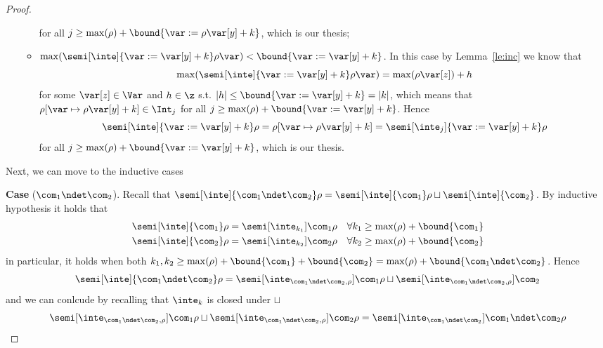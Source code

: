 \begin{proof}
\begin{itemize}
\begin{itemize}
      for all \(j \geq \max(\rho) + \bound{\var := \rho\var[y] + k}\),
      which is our thesis;
    \item
      \({\max(\semi[\inte]{\var := \var[y] + k}\rho\var)} <
      \bound{\var := \var[y] + k}\). In this case by
      Lemma~\ref{le:inc} we know that
      \begin{equation*}
        {\max(\semi[\inte]{\var := \var[y] + k}\rho\var)} = {\max(\rho\var[z]) + h}
      \end{equation*}
      for some \(\var[z] \in \Var\) and \(h \in \z\) s.t.
      \(|h| \leq \bound{\var := \var[y] + k} = |k|\), which means that
      \({\rho[\var \mapsto \rho\var[y] + k]} \in \Int_j\) for all
      \(j \geq \max(\rho) + \bound{\var := \var[y] + k}\).
      Hence
      \begin{equation*}
        \semi[\inte]{\var := \var[y] + k}\rho =
        \rho[\var \mapsto \rho\var[y] + k] =
        \semi[\inte_j]{\var := \var[y] + k}\rho
      \end{equation*}
      for all \(j \geq \max(\rho) + \bound{\var := \var[y] + k}\),
      which is our thesis.
    \end{itemize}
  \end{itemize}
  
  \medskip
  \noindent
  Next, we can move to the inductive cases
  
  \medskip
  
  \noindent
  \textbf{Case} (\(\com_1 \ndet \com_2\)).
  Recall that
  \({\semi[\inte]{\com_1 \ndet \com_2}\rho} =
  {\semi[\inte]{\com_1}\rho} \sqcup {\semi[\inte]{\com_2}}\). By
  inductive hypothesis it holds that
  \begin{align*}
    {\semi[\inte]{\com_1}\rho} & = \semi[\inte_{k_1}]{\com_1}\rho & \forall k_1 \geq \max(\rho) + \bound{\com_1} \\
    {\semi[\inte]{\com_2}\rho} & = \semi[\inte_{k_2}]{\com_2}\rho & \forall k_2 \geq \max(\rho) + \bound{\com_2}
  \end{align*}
  in particular, it holds when both
  \({k_1, k_2} \geq {\max(\rho) + \bound{\com_1} + \bound{\com_2}} =
  {\max(\rho) + \bound{\com_1 \ndet \com_2}}\). Hence
  \begin{equation*}
    {\semi[\inte]{\com_1 \ndet \com_2}\rho} = {\semi[\inte_{\com_1 \ndet \com_2, \rho}]{\com_1}\rho} \sqcup {\semi[\inte_{\com_1 \ndet \com_2, \rho}]{\com_2}}
  \end{equation*}
  and we can conlcude by recalling that \(\inte_k\) is closed under
  \(\sqcup\)
  \begin{equation*} {\semi[\inte_{\com_1 \ndet \com_2,
        \rho}]{\com_1}\rho} \sqcup {\semi[\inte_{\com_1 \ndet \com_2,
        \rho}]{\com_2}\rho} = {\semi[\inte_{\com_1\ndet\com_2}]{\com_1
        \ndet \com_2}\rho}
  \end{equation*}


\end{proof}
